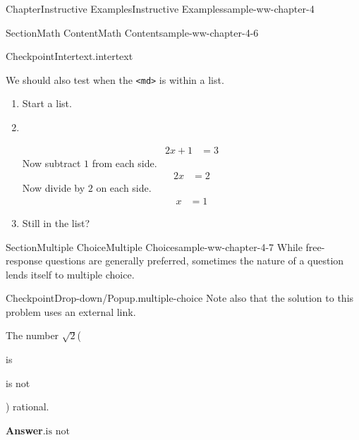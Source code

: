 \documentclass[oneside,10pt,]{book}
\newcommand{\blocktitlefont}{\relax}
\newcommand{\mono}[1]{\texttt{#1}}
\numberwithin{equation}{section}
\newcommand{\amp}{&}
\begin{document}
\begin{chapterptx}{Chapter}{Instructive Examples}{}{Instructive Examples}{}{}{sample-ww-chapter-4}
\begin{sectionptx}{Section}{Math Content}{}{Math Content}{}{}{sample-ww-chapter-4-6}
\begin{inlineexercise}{Checkpoint}{Intertext.}{intertext}
\begin{equation*}
\end{equation*}
%
\par
We should also test when the \mono{<md>} is within a list.%
\begin{enumerate}[label={\alph*.}]
\item{}Start a list.%
\item{}~%
\par
%
\begin{equation*}
\begin{aligned}
2x+1 \amp= 3
\end{aligned}
\end{equation*}
Now subtract \(1\) from each side.%
\begin{equation*}
\begin{aligned}
2x   \amp= 2
\end{aligned}
\end{equation*}
Now divide by \(2\) on each side.%
\begin{equation*}
\begin{aligned}
x    \amp= 1
\end{aligned}
\end{equation*}
%
\item{}Still in the list?%
\end{enumerate}
%
\end{inlineexercise}%
\end{sectionptx}
%
%
\typeout{************************************************}
\typeout{************************************************}
%
\begin{sectionptx}{Section}{Multiple Choice}{}{Multiple Choice}{}{}{sample-ww-chapter-4-7}
While free-response questions are generally preferred, sometimes the nature of a question lends itself to multiple choice.%
\begin{inlineexercise}{Checkpoint}{Drop-down\slash{}Popup.}{multiple-choice}%
Note also that the solution to this problem uses an external link.%
\par
The number \(\sqrt{2}\)\quad(\begin{itemize*}[label=$\square$,leftmargin=3em,itemjoin=\hspace{1em}]
\item{}is%
\item{}is not%
\end{itemize*})\quad
rational.%
\par\smallskip%
\noindent\textbf{\blocktitlefont Answer}.\hypertarget{multiple-choice-3}{}\quad{}\(\text{is not}\)%
\par\smallskip%

\end{inlineexercise}
\end{sectionptx}
\end{chapterptx}
\end{document}
